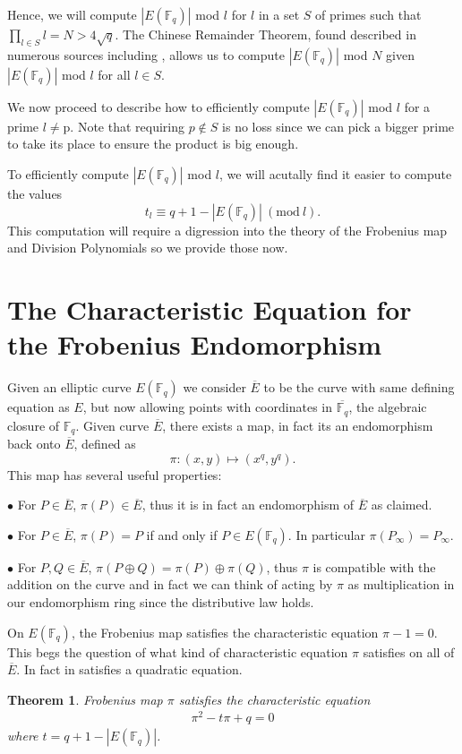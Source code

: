 \documentclass{article}
\newtheorem{Thm}{Theorem}
\newcommand{\f}{\mathbb{F}}
\begin{document}
Hence, we will compute $|E(\f_q)|$ mod $l$ for $l$ in a set $S$ of primes such that $\prod_{l \in S} l = N > 4\sqrt{q}$.  The Chinese Remainder Theorem, 
found described in numerous sources including 
\cite{CRT}, allows us to compute $|E(\f_q)|$ mod $N$ given $|E(\f_q)|$ mod $l$ for all $l \in S$.

We now proceed to describe how to efficiently compute $|E(\f_q)|$ mod $l$ for a prime $l \not = $p.  Note that requiring $p \not\in S$ is no loss since
we can pick a bigger prime to take its place to ensure the product is big enough.

To efficiently compute $|E(\f_q)|$ mod $l$, we will acutally find it easier to compute the values
$$t_l \equiv q + 1 -|E(\f_q)|~(\mathrm{mod~} l).$$
This computation will require a digression into the theory of the Frobenius map and Division
Polynomials so we provide those now.

\section{The Characteristic Equation for the Frobenius Endomorphism} \label{FrobChar}

Given an elliptic curve $E(\f_q)$ we consider $\overline{E}$ to be the curve with same defining equation as $E$, but now allowing points with coordinates
in $\overline{\f_q}$, the algebraic closure of $\f_q$.  Given curve $\overline{E}$, there exists a map, in fact its an endomorphism back onto
$\overline{E}$, defined as
$$\pi : (x,y) \mapsto (x^q,y^q).$$
This map has several useful properties:

$\bullet$ For $P \in \overline{E}$, $\pi(P) \in \overline{E}$, thus it is in fact an endomorphism of $\overline{E}$ as claimed.

$\bullet$ For $P \in \overline{E}$, $\pi(P) = P$ if and only if $P \in E(\f_q)$.  In particular $\pi(P_\infty) = P_\infty$.

$\bullet$ For $P,Q \in \overline{E}$, $\pi(P\oplus Q) = \pi(P) \oplus \pi(Q)$, thus $\pi$ is compatible with the addition on the curve and in fact
we can think of acting by $\pi$ as multiplication in our endomorphism ring since the distributive law holds.

On $E(\f_q)$, the Frobenius map satisfies the characteristic equation $\pi - 1 = 0$.  This begs the question of what kind of characteristic equation
$\pi$ satisfies on all of $\overline{E}$.  In fact in satisfies a quadratic equation.

\begin{Thm} \label{chareqn}
Frobenius map $\pi$ satisfies the characteristic equation \begin{eqnarray} \label{eqnchar} \pi^2 - t\pi + q = 0\end{eqnarray} where $t = q + 1
- |E(\f_q)|$.
\end{Thm}
\end{document}
